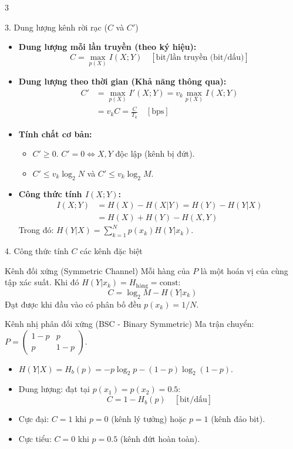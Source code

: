 \documentclass[10pt,landscape,a4paper]{article}
\begin{document}
\begin{multicols*}{3}
\begin{cheatbox}{3. Dung lượng kênh rời rạc ($C$ và $C'$)}
\begin{itemize}[leftmargin=*,noitemsep]
    \item \textbf{Dung lượng mỗi lần truyền (theo ký hiệu):}
    \[ C = \max_{p(X)} I(X; Y) \quad [\text{bit/lần truyền (bit/dấu)}] \]
    \item \textbf{Dung lượng theo thời gian (Khả năng thông qua):}
    \begin{align*}
        C' &= \max_{p(X)} I'(X;Y) = v_k \max_{p(X)} I(X; Y) \\
           &= v_k C = \frac{C}{T_k} \quad [\text{bps}]
    \end{align*}
    \item \textbf{Tính chất cơ bản:}
    \begin{itemize}[leftmargin=*,noitemsep]
        \item $C' \ge 0$. $C' = 0 \iff X, Y$ độc lập (kênh bị đứt).
        \item $C' \le v_k \log_2 N$ và $C' \le v_k \log_2 M$.
    \end{itemize}
    \item \textbf{Công thức tính $I(X; Y)$:}
    \begin{align*}
        I(X; Y) &= H(X) - H(X|Y) = H(Y) - H(Y|X) \\
                &= H(X) + H(Y) - H(X, Y)
    \end{align*}
    Trong đó: $H(Y|X) = \sum_{k=1}^N p(x_k) H(Y|x_k)$.
\end{itemize}
\end{cheatbox}

\begin{cheatbox}{4. Công thức tính $C$ các kênh đặc biệt}
\begin{subbox}{Kênh đối xứng (Symmetric Channel)}
Mỗi hàng của $P$ là một hoán vị của cùng tập xác suất. Khi đó $H(Y|x_k) = H_{\text{hàng}} = \text{const}$:
\[ C = \log_2 M - H(Y|x_k) \]
Đạt được khi đầu vào có phân bố đều $p(x_k) = 1/N$.
\end{subbox}

\begin{subbox}{Kênh nhị phân đối xứng (BSC - Binary Symmetric)}
Ma trận chuyển: $P = \begin{pmatrix} 1-p & p \\ p & 1-p \end{pmatrix}$.
\begin{itemize}[leftmargin=*,noitemsep]
    \item $H(Y|X) = H_b(p) = -p\log_2 p - (1-p)\log_2(1-p)$.
    \item Dung lượng: đạt tại $p(x_1) = p(x_2) = 0.5$:
    \[ C = 1 - H_b(p) \quad [\text{bit/dấu}] \]
    \item Cực đại: $C = 1$ khi $p = 0$ (kênh lý tưởng) hoặc $p = 1$ (kênh đảo bit).
    \item Cực tiểu: $C = 0$ khi $p = 0.5$ (kênh đứt hoàn toàn).
\end{itemize}
\end{subbox}


\end{cheatbox}
\end{multicols*}
\end{document}
